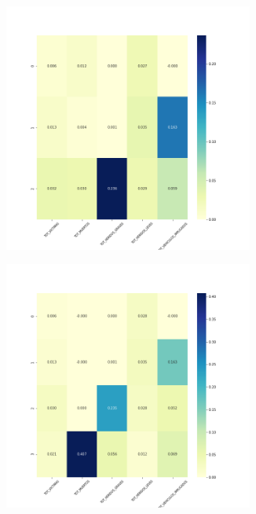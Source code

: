 \begin{figure}[H]
\begin{subfigure}{.5\textwidth}
  \centering
  \includegraphics[width=0.9\textwidth]{imagenes/case1/kmeans/heatmaps/hm_kmeans_case1_salida_k3.png}
\end{subfigure}%
\begin{subfigure}{.5\textwidth}
  \centering
  \includegraphics[width=0.9\textwidth]{imagenes/case1/kmeans/heatmaps/hm_kmeans_case1_salida_k4.png}

\end{subfigure}
\end{figure}
